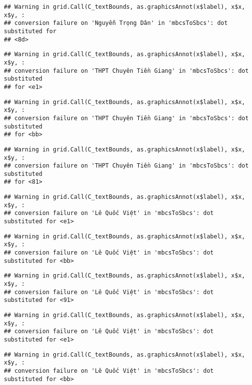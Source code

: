 \documentclass[
]{article}
\begin{document}
\begin{verbatim}
## Warning in grid.Call(C_textBounds, as.graphicsAnnot(x$label), x$x, x$y, :
## conversion failure on 'Nguyễn Trọng Dân' in 'mbcsToSbcs': dot substituted for
## <8d>
\end{verbatim}

\begin{verbatim}
## Warning in grid.Call(C_textBounds, as.graphicsAnnot(x$label), x$x, x$y, :
## conversion failure on 'THPT Chuyên Tiền Giang' in 'mbcsToSbcs': dot substituted
## for <e1>
\end{verbatim}

\begin{verbatim}
## Warning in grid.Call(C_textBounds, as.graphicsAnnot(x$label), x$x, x$y, :
## conversion failure on 'THPT Chuyên Tiền Giang' in 'mbcsToSbcs': dot substituted
## for <bb>
\end{verbatim}

\begin{verbatim}
## Warning in grid.Call(C_textBounds, as.graphicsAnnot(x$label), x$x, x$y, :
## conversion failure on 'THPT Chuyên Tiền Giang' in 'mbcsToSbcs': dot substituted
## for <81>
\end{verbatim}

\begin{verbatim}
## Warning in grid.Call(C_textBounds, as.graphicsAnnot(x$label), x$x, x$y, :
## conversion failure on 'Lê Quốc Việt' in 'mbcsToSbcs': dot substituted for <e1>
\end{verbatim}

\begin{verbatim}
## Warning in grid.Call(C_textBounds, as.graphicsAnnot(x$label), x$x, x$y, :
## conversion failure on 'Lê Quốc Việt' in 'mbcsToSbcs': dot substituted for <bb>
\end{verbatim}

\begin{verbatim}
## Warning in grid.Call(C_textBounds, as.graphicsAnnot(x$label), x$x, x$y, :
## conversion failure on 'Lê Quốc Việt' in 'mbcsToSbcs': dot substituted for <91>
\end{verbatim}

\begin{verbatim}
## Warning in grid.Call(C_textBounds, as.graphicsAnnot(x$label), x$x, x$y, :
## conversion failure on 'Lê Quốc Việt' in 'mbcsToSbcs': dot substituted for <e1>
\end{verbatim}

\begin{verbatim}
## Warning in grid.Call(C_textBounds, as.graphicsAnnot(x$label), x$x, x$y, :
## conversion failure on 'Lê Quốc Việt' in 'mbcsToSbcs': dot substituted for <bb>
\end{verbatim}
\end{document}
